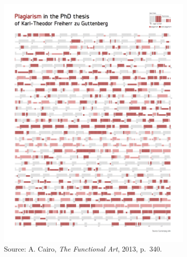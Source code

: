 \documentclass[
  letterpaper,
  DIV=11,
  numbers=noendperiod]{scrreprt}
\begin{document}
\begin{figure}[H]

{\centering \includegraphics[width=0.85\textwidth,height=\textheight]{src/../images/plagiarism.png}

}

\caption{Source: A. Cairo, \emph{The Functional Art}, 2013, p.~340.}

\end{figure}%

\hfill\break
\hfill\break
\hfill\break
\end{document}

